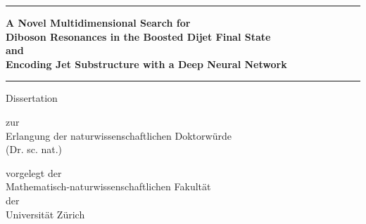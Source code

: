 \begin{center}

  \thispagestyle{empty}
  {\parindent0cm
   \rule{\linewidth}{.4ex}}
  \begin{center}

    \bfseries\large
    A Novel Multidimensional Search for\\ 
    Diboson Resonances in the Boosted Dijet Final State\\
    \vspace{0.2 in}
    and\\
    \vspace{0.2 in}
    Encoding Jet Substructure with a Deep Neural Network\\
  \end{center}
  \rule{\linewidth}{.4ex}

\par
\vspace{0.2 in}

{\large Dissertation}
\vspace{0.1in}

zur \\
Erlangung der 
naturwissenschaftlichen Doktorw\"urde \\
(Dr. sc. nat.) \\
\par
\vspace{0.2in}


vorgelegt der\\
Mathematisch-naturwissenschaftlichen Fakult\"at \\
der \\
\vspace{0.05in}
{\large Universit\"at Z\"urich}
\par


\end{center}
